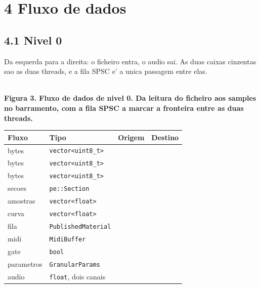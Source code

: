 \documentclass[11pt,a4paper,landscape]{article}
\newcommand{\figura}[2]{%
  \sbox{\figbox}{}%
  \pgfmathsetmacro{\atlasw}{\the\wd\figbox}%
  \pgfmathsetmacro{\atlasalt}{\the\ht\figbox + \the\dp\figbox}%
  \pgfmathsetmacro{\atlaslin}{\the\linewidth}%
  \pgfmathsetmacro{\atlask}{min(\atlaslin/\atlasw, 432.00168/\atlasalt)}%
  \pgfmathsetmacro{\atlasnw}{\atlasw*\atlask}%
  \begin{center}%
  \resizebox{\atlasnw pt}{!}{\usebox{\figbox}}\\[5pt]
  {\footnotesize\bfseries #2}%
  \end{center}%
}
\begin{document}
\section*{4 Fluxo de dados}

\subsection*{4.1 Nivel 0}

Da esquerda para a direita: o ficheiro entra, o audio sai. As duas caixas
cinzentas sao as duas threads, e a fila SPSC e' a unica passagem entre elas.

\figura{dataflow-l0}{Figura 3. Fluxo de dados de nivel 0. Da leitura do ficheiro aos samples no barramento, com a fila SPSC a marcar a fronteira entre as duas threads.}

\begin{center}
\begin{tabular}{@{}L{3.4cm}L{5.4cm}L{7.6cm}L{8.6cm}@{}}
\toprule
{}
\textbf{Fluxo} & \textbf{Tipo} & \textbf{Origem} & \textbf{Destino} \\
\midrule
bytes & \texttt{vector<uint8\_t>} &  &  \\
bytes & \texttt{vector<uint8\_t>} &  &  \\
bytes & \texttt{vector<uint8\_t>} &  &  \\
secoes & \texttt{pe::Section} &  &  \\
amostras & \texttt{vector<float>} &  &  \\
curva & \texttt{vector<float>} &  &  \\
fila & \texttt{PublishedMaterial} &  &  \\
midi & \texttt{MidiBuffer} &  &  \\
gate & \texttt{bool} &  &  \\
parametros & \texttt{GranularParams} &  &  \\
audio & \texttt{float}, dois canais &  &  \\
\bottomrule
\end{tabular}
\end{center}
\end{document}
